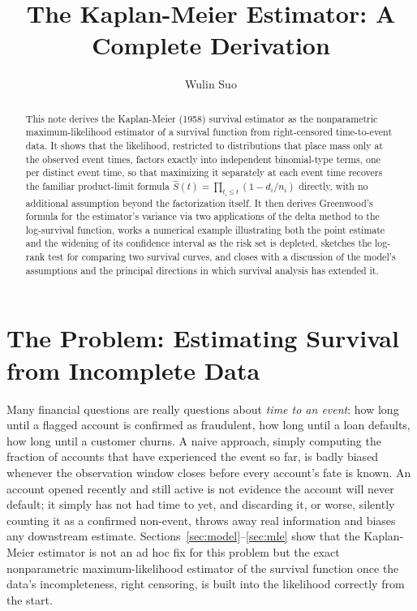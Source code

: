\documentclass[11pt]{article}
\title{The Kaplan-Meier Estimator: A Complete Derivation}
\author{Wulin Suo}
\date{}
\theoremstyle{remark}
\theoremstyle{definition}
\begin{document}
\maketitle

\begin{abstract}
\noindent This note derives the Kaplan-Meier (1958) survival estimator as the nonparametric maximum-likelihood estimator of a survival function from right-censored time-to-event data. It shows that the likelihood, restricted to distributions that place mass only at the observed event times, factors exactly into independent binomial-type terms, one per distinct event time, so that maximizing it separately at each event time recovers the familiar product-limit formula $\hat S(t)=\prod_{t_i\le t}(1-d_i/n_i)$ directly, with no additional assumption beyond the factorization itself. It then derives Greenwood's formula for the estimator's variance via two applications of the delta method to the log-survival function, works a numerical example illustrating both the point estimate and the widening of its confidence interval as the risk set is depleted, sketches the log-rank test for comparing two survival curves, and closes with a discussion of the model's assumptions and the principal directions in which survival analysis has extended it.
\end{abstract}

\section{The Problem: Estimating Survival from Incomplete Data}
\label{sec:setup}

Many financial questions are really questions about \emph{time to an event}: how long until a flagged account is confirmed as fraudulent, how long until a loan defaults, how long until a customer churns. A naive approach, simply computing the fraction of accounts that have experienced the event so far, is badly biased whenever the observation window closes before every account's fate is known. An account opened recently and still active is not evidence the account will never default; it simply has not had time to yet, and discarding it, or worse, silently counting it as a confirmed non-event, throws away real information and biases any downstream estimate. Sections~\ref{sec:model}--\ref{sec:mle} show that the Kaplan-Meier estimator is not an ad hoc fix for this problem but the exact nonparametric maximum-likelihood estimator of the survival function once the data's incompleteness, right censoring, is built into the likelihood correctly from the start.
\end{document}
